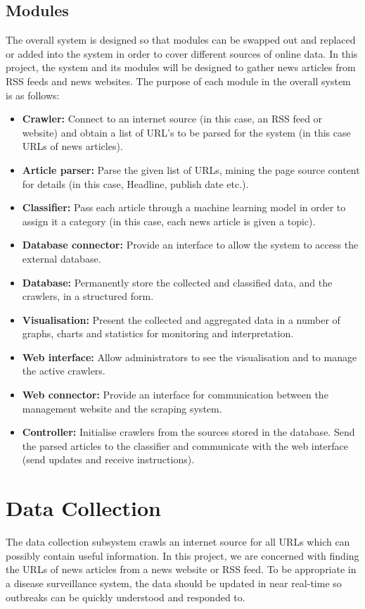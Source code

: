 \documentclass{l4proj}
\begin{document}
\subsection{Modules}
The overall system is designed so that modules can be swapped out and replaced or added into the system in order to cover different sources of online data. In this project, the system and its modules will be designed to gather news articles from RSS feeds and news websites. The purpose of each module in the overall system is as follows:
\begin{itemize}
    \item \textbf{Crawler: }Connect to an internet source (in this case, an RSS feed or website) and obtain a list of URL's to be parsed for the system (in this case URLs of news articles).
    \item \textbf{Article parser: }Parse the given list of URLs, mining the page source content for details (in this case, Headline, publish date etc.).
    \item \textbf{Classifier: }Pass each article through a machine learning model in order to assign it a category (in this case, each news article is given a topic).
    \item \textbf{Database connector: }Provide an interface to allow the system to access the external database.
    \item \textbf{Database: }Permanently store the collected and classified data, and the crawlers, in a structured form.
    \item \textbf{Visualisation: }Present the collected and aggregated data in a number of graphs, charts and statistics for monitoring and interpretation.
    \item \textbf{Web interface: }Allow administrators to see the visualisation and to manage the active crawlers.
    \item \textbf{Web connector: }Provide an interface for communication between the management website and the scraping system.
    \item \textbf{Controller: }Initialise crawlers from the sources stored in the database. Send the parsed articles to the classifier and communicate with the web interface (send updates and receive instructions).
\end{itemize}


\section{Data Collection}
The data collection subsystem crawls an internet source for all URLs which can possibly contain useful information. In this project, we are concerned with finding the URLs of news articles from a news website or RSS feed. To be appropriate in a disease surveillance system, the data should be updated in near real-time so outbreaks can be quickly understood and responded to.
\end{document}
